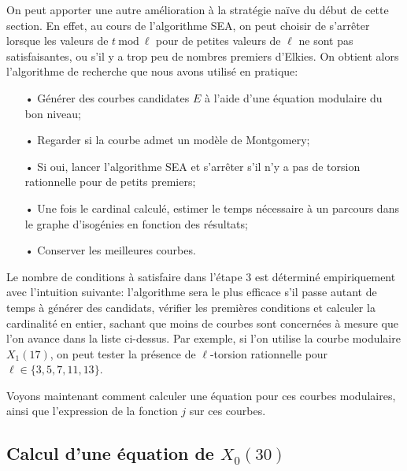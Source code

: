 \documentclass[11pt,a4paper]{article}
\renewcommand{\mod}{\ \mathrm{mod}\ }
\renewcommand{\v}{\vspace{5mm}}
\theoremstyle{definition}
\begin{document}
\v
On peut apporter une autre amélioration à la stratégie naïve du début de cette section. En effet, au cours de l'algorithme SEA, on peut choisir de s'arrêter lorsque les valeurs de $t \mod \ell$ pour de petites valeurs de $\ell$ ne sont pas satisfaisantes, ou s'il y a trop peu de nombres premiers d'Elkies. On obtient alors l'algorithme de recherche que nous avons utilisé en pratique:
\begin{itemize}
\item[•] Générer des courbes candidates $E$ à l'aide d'une équation modulaire du bon niveau;
\item[•] Regarder si la courbe admet un modèle de Montgomery;
\item[•] Si oui, lancer l'algorithme SEA et s'arrêter s'il n'y a pas de torsion rationnelle pour de petits premiers;
\item[•] Une fois le cardinal calculé, estimer le temps nécessaire à un parcours dans le graphe d'isogénies en fonction des résultats;
\item[•] Conserver les meilleures courbes.
\end{itemize}

Le nombre de conditions à satisfaire dans l'étape 3 est déterminé empiriquement avec l'intuition suivante: l'algorithme sera le plus efficace s'il passe autant de temps à générer des candidats, vérifier les premières conditions et calculer la cardinalité en entier, sachant que moins de courbes sont concernées à mesure que l'on avance dans la liste ci-dessus. Par exemple, si l'on utilise la courbe modulaire $X_1(17)$,
on peut tester la présence de $\ell$-torsion rationnelle pour $\ell\in\{3, 5, 7, 11, 13\}$.

\v

Voyons maintenant comment calculer une équation pour ces courbes modulaires, ainsi que l'expression de la fonction $j$ sur ces courbes.

\subsection{Calcul d'une équation de $X_0(30)$}
\end{document}

